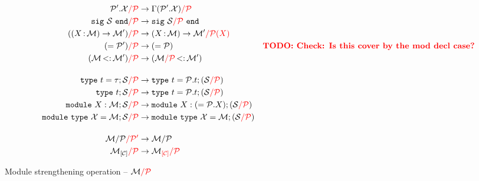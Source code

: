 \begin{align*}
  \Ostrengthen{l}{\iP}{\iP'.\iX}
  &\to \Ostrengthen{l}{\iP}{\lookup{\E}{\iP'.\iX}}\\
  \Ostrengthen{l}{\iP}{\Ssig{\iS}}
  &\to \Ssig{\Ostrengthen{l}{\iP}{\iS}}\\
  \Ostrengthen{l}{\iP}{(\Sfunctor{\ix}{\iM}{\iM'})}
  &\to \Sfunctor{\ix}{\iM}{\Ostrengthen{l}{\iP(X)}{\iM'}}\\
  \Ostrengthen{l}{\iP}{\Salias{\iP'}}
  &\to \Salias{\iP} &\TODO{Check: Is this cover by the mod decl case?}\\
  \Ostrengthen{l}{\iP}{\Stransp{\iM}{\iM'}}
  &\to \Stransp{\Ostrengthen{l}{\iP}{\iM}}{\iM'}\\[4mm]
  \Ostrengthen{l}{\iP}{\Stype{t}{\tau};\iS}
  &\to \Stype{t}{\iP.t};(\Ostrengthen{l}{\iP}{\iS}) %
  \\
  \Ostrengthen{l}{\iP}{\Stypeabs{t};\iS}
  &\to \Stype{t}{\iP.t};(\Ostrengthen{l}{\iP}{\iS}) %
  \\
  \Ostrengthen{l}{\iP}{\Smodulety{\ix}{\iM};\iS}
  &\to \Smodulety{\ix}{\Salias{\iP.\ix}};
    (\Ostrengthen{l}{\iP}{\iS}) %
  \\
  \Ostrengthen{l}{\iP}{\Smoduletype{\iX}{\iM};\iS}
  &\to \Smoduletype{\iX}{\iM};
    (\Ostrengthen{l}{\iP}{\iS}) \\[4mm]
  \Ostrengthen{l'}{\iP'}{\Sstrengthen{l}{\iP}{\iM}}
  &\to \Sstrengthen{l}{\iP}{\iM}\\
  \Ostrengthen{l}{\iP}{\Senrich{\iC}{\iM}}
  &\to \Ostrengthen{l}{\iP}{\Oenrich{\iC}{\iM}}\\
\end{align*}\vspace{-3mm}
\caption{Module strengthening operation -- $\Ostrengthen{l}{\iP}{\iM}$}
\label{module:strengthen}

